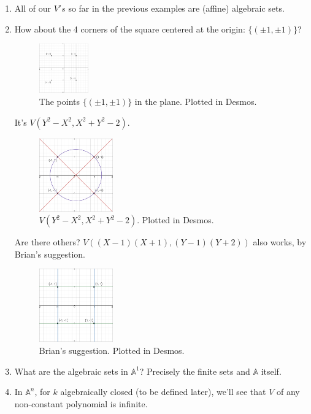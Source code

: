\documentclass[12pt]{article}
\theoremstyle{definition}
\begin{document}
\begin{enumerate}
    \item All of our $V's$ so far in the previous examples are (affine) algebraic sets.
    \item How about the 4 corners of the square centered at the origin: $\{(\pm1,\pm1)\}$?
    \begin{figure}[H]
        \centering
        \includegraphics[width=0.2\textwidth]{3.png}
        \caption{The points $\{(\pm1,\pm1)\}$ in the plane. Plotted in Desmos.}
    \end{figure}
    It's $V(Y^2-X^2,X^2+Y^2-2)$.
    \begin{figure}[H]
        \centering
        \includegraphics[width=0.3\textwidth]{4.png}
        \caption{$V(Y^2-X^2,X^2+Y^2-2)$. Plotted in Desmos.}
    \end{figure}
    Are there others? $V((X-1)(X+1),(Y-1)(Y+2))$ also works, by Brian's suggestion.
    \begin{figure}[H]
        \centering
        \includegraphics[width=0.3\textwidth]{5.png}
        \caption{Brian's suggestion. Plotted in Desmos.}
    \end{figure}
    \item What are the algebraic sets in $\mathbb{A}^1$? Precisely the finite sets and $\mathbb{A}$ itself.
    \item In $\mathbb{A}^n$, for $k$ algebraically closed (to be defined later), we'll see that $V$ of any non-constant polynomial is infinite.
\end{enumerate}
\end{document}
